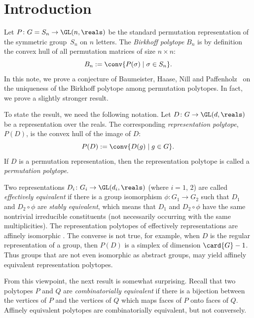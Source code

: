 \section{Introduction}
Let $P\colon G= S_n \to \GL(n,\reals)$ be the 
standard permutation representation of 
the symmetric group~$S_n$ on $n$ letters.
The \emph{Birkhoff polytope} $B_n$ is by definition
the convex hull of all permutation matrices of size $n\times n$:
\[ B_n := \conv\{ P(\sigma) \mid \sigma\in S_n\}.
\]
In this note, we prove a conjecture of
Baumeister, Haase, Nill and Paffenholz~\cite[Conjecture~5.3]{BHNP09}
on the uniqueness of the Birkhoff polytope among
permutation polytopes.
In fact, we prove a slightly stronger result.

To state the result, we need the following notation.
Let $D\colon G\to \GL(d,\reals)$
be a representation over the reals.
The corresponding \emph{representation polytope},
$P(D)$, is the convex hull of the image of $D$:
\[ P(D):= \conv\{ D(g) \mid g\in G
               \}.
\]
If $D$ is a permutation representation, then the 
representation polytope is called a 
\emph{permutation polytope}.

Two representations 
$D_i\colon G_i \to \GL(d_i,\reals)$
(where $i=1$, $2$) are called 
\emph{effectively equivalent} if there is 
a group isomorphism $\phi\colon G_1\to G_2$
such that $D_1$ and $D_2\circ \phi$ are 
\emph{stably equivalent},
which means that $D_1$ and $D_2\circ \phi$ 
have the same nontrivial irreducible constituents 
(not necessarily occurring with the same multiplicities).
The representation polytopes of effectively representations are
affinely isomorphic
\cite[Theorem~2.4]{BaumeisterGrueninger15} \cite[\S~2]{BHNP09}.
The converse is not true, for example, 
when $D$ is the regular representation of a group,
then $P(D)$ is a simplex of dimension $\card{G}-1$.
Thus groups that are not even isomorphic as abstract groups,
may yield affinely equivalent representation polytopes.

From this viewpoint, the next result is somewhat surprising.
Recall that two polytopes 
$P$ and $Q$ are
\emph{combinatorially equivalent}
if there is a bijection between the vertices of $P$
and the vertices of $Q$ which maps faces of $P$
onto faces of $Q$.
Affinely equivalent polytopes are combinatorially equivalent,
but not conversely.

